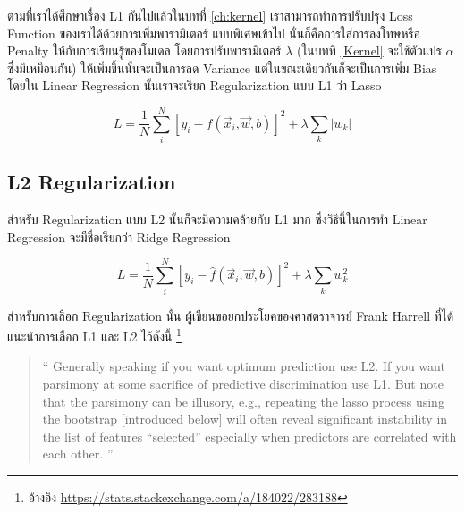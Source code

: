 ตามที่เราได้ศึกษาเรื่อง L1 กันไปแล้วในบทที่ \ref{ch:kernel} เราสามารถทำการปรับปรุง Loss Function ของเราได้ด้วยการเพิ่มพารามิเตอร์%
แบบพิเศษเข้าไป นั่นก็คือการใส่การลงโทษหรือ Penalty ให้กับการเรียนรู้ของโมเดล โดยการปรับพารามิเตอร์ $\lambda$ (ในบทที่ \ref{Kernel}
จะใช้ตัวแปร $\alpha$ ซึ่งมีเหมือนกัน) ให้เพิ่มขึ้นนั้นจะเป็นการลด Variance แต่ในขณะเดียวกันก็จะเป็นการเพิ่ม Bias โดยใน Linear Regression
นั้นเราจะเรียก Regularization แบบ L1 ว่า Lasso

\begin{equation}
    L = \frac{1}{N}\sum_i^N \left[y_i - \hat{f}(\vec{x}_i, \vec{w}, b)\right]^2 + \lambda \sum_k \left|w_k\right|
\end{equation}

\subsection{L2 Regularization}

สำหรับ Regularization แบบ L2 นั้นก็จะมีความคล้ายกับ L1 มาก ซึ่งวิธีนี้ในการทำ Linear Regression จะมีชื่อเรียกว่า Ridge Regression

\begin{equation}
    L = \frac{1}{N}\sum_i^N \left[y_i - \hat{f}(\vec{x}_i, \vec{w}, b)\right]^2 + \lambda \sum_k w_k^2
\end{equation}


สำหรับการเลือก Regularization นั้น ผู้เขียนขอยกประโยคของศาสตราจารย์ Frank Harrell ที่ได้แนะนำการเลือก L1 และ L2 ไว้ดังนี้
\footnote{อ้างอิง \url{https://stats.stackexchange.com/a/184022/283188}}

\blockquote{\enquote{
    Generally speaking if you want optimum prediction use L2. 
    If you want parsimony at some sacrifice of predictive discrimination use L1. 
    But note that the parsimony can be illusory, e.g., repeating the lasso process 
    using the bootstrap [introduced below] will often reveal significant instability 
    in the list of features “selected” especially when predictors are correlated with each other.
}
}
